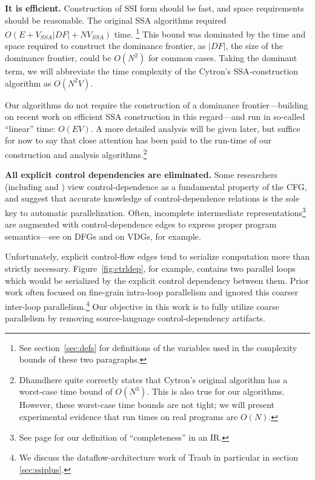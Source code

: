 \documentclass[12pt,titlepage,twoside]{article}
\begin{document}
\textbf{It is efficient.}  Construction of SSI form should be fast,
and space requirements should be reasonable.  The original SSA
algorithms required $O(E+V_{SSA}|{DF}|+NV_{SSA})$ time.%
\footnote{See section~\ref{sec:defs} for definitions of the
variables used in the complexity bounds of these two paragraphs.}
This bound
was dominated by the time and space required to construct the
dominance frontier, as $|{DF}|$, the size of the dominance frontier,
could be $O(N^2)$ for common cases.  Taking the dominant term, we will
abbreviate the time complexity of the Cytron's SSA-construction
algorithm as $O(N^2 V)$.

Our algorithms do not require the construction of a dominance
frontier---building on recent work on efficient SSA construction in
this regard---and run in so-called ``linear'' time: $O(EV)$.  A more
detailed analysis will be given later, but suffice for now to say that
close attention has been paid to the run-time of our construction and
analysis algorithms.\footnote{Dhamdhere \cite{dhamdhere92:large} quite
correctly states that Cytron's original algorithm has a worst-case
time bound of $O(N^3)$.  This is also true for our algorithms.
However, these worst-case time bounds are not tight; we will present
experimental evidence that run times on real programs are $O(N)$.}
       

\textbf{All explicit control dependencies are eliminated.}
Some researchers (including \cite{appel:modern} and
\cite{pingali97:apt}) view control-dependence as a fundamental
property of the CFG, and \cite{ballance90:pdw,appel:modern} suggest
that accurate knowledge of control-dependence relations is the sole
key to automatic parallelization.  Often, incomplete intermediate
representations\footnote{See page \pageref{sec:complete} for our
definition of ``completeness'' in an IR.} are augmented with
control-dependence edges to express proper program semantics---see
\cite{johnson93:dfg} on DFGs and \cite{weise94:vdg} on VDGs, for
example.

Unfortunately, explicit control-flow edges tend to serialize
computation more than strictly necessary.  Figure~\vref{fig:ctrldep},
for example, contains two parallel loops which would be serialized by
the explicit control dependency between them.  Prior work often
focused on fine-grain intra-loop parallelism and ignored this coarser
inter-loop parallelism.\footnote{We discuss the dataflow-architecture
work of Traub \cite{traub86:ttda} in particular in section
\ref{sec:ssiplus}.} Our objective in this work is to fully utilize
coarse parallelism by removing source-language control-dependency artifacts.
\end{document}
